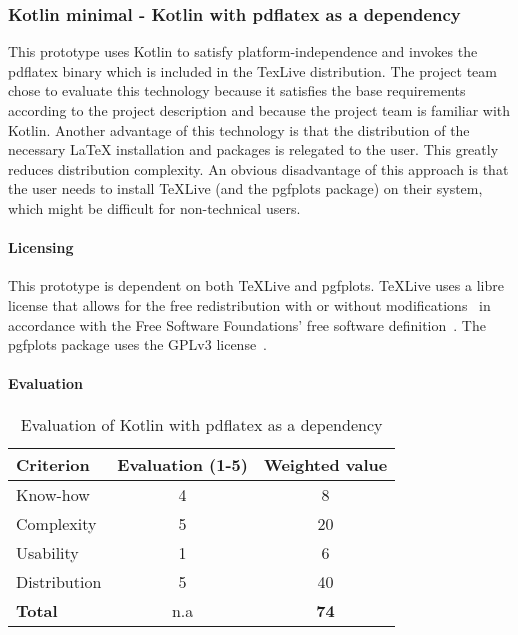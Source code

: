 \subsubsection{Kotlin minimal - Kotlin with pdflatex as a dependency}
\label{subsubsec:kotlin_minimal}
This prototype uses Kotlin to satisfy platform-independence and invokes the pdflatex binary which is included in the TexLive distribution.
The project team chose to evaluate this technology because it satisfies the base requirements according to the project description and because
the project team is familiar with Kotlin.
Another advantage of this technology is that the distribution of the necessary LaTeX installation and packages is relegated to the user.
This greatly reduces distribution complexity.\newline
An obvious disadvantage of this approach is that the user needs to install TeXLive (and the pgfplots package) on their system, which might be difficult for non-technical users.

\paragraph{Licensing}\mbox{}\newline
This prototype is dependent on both TeXLive and pgfplots.
TeXLive uses a libre license that allows for the free redistribution with or without modifications~\cite{texlive_license} in accordance with the Free Software Foundations' free software definition~\cite{fsf_free_software}.
The pgfplots package uses the GPLv3 license~\cite{pgfplots}.

\paragraph{Evaluation}\mbox{}\newline
\begin{table}[H]
    \centering
    \begin{tabular}{|l|c|c|}
        \hline
        \textbf{Criterion} & \textbf{Evaluation (1-5)} & \textbf{Weighted value} \\
        \hline
        Know-how & 4 & 8 \\
        \hline
        Complexity & 5 & 20 \\
        \hline
        Usability & 1 & 6 \\
        \hline
        Distribution & 5 & 40 \\
        \hline
        \textbf{Total} & n.a & \textbf{74} \\
        \hline
    \end{tabular}
    \caption{Evaluation of Kotlin with pdflatex as a dependency}
    \label{table:kotlin_minimal_evaluation}
\end{table}

